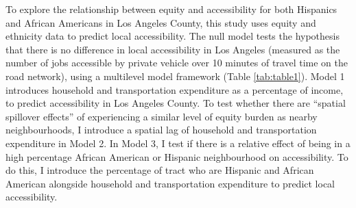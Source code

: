 \documentclass[a4paper,UKenglish]{lipics-v2018}
\begin{document}
To explore the relationship between equity and accessibility for both Hispanics and African Americans in Los Angeles County, this study uses equity and ethnicity data to predict local accessibility. The null model tests the hypothesis that there is no difference in local accessibility in Los Angeles (measured as the number of jobs accessible by private vehicle over 10 minutes of travel time on the road network), using a multilevel model framework (Table \ref{tab:table1}). Model 1 introduces household and transportation expenditure as a percentage of income, to predict accessibility in Los Angeles County. To test whether there are “spatial spillover effects” of experiencing a similar level of equity burden as nearby neighbourhoods, I introduce a spatial lag of household and transportation expenditure in Model 2. In Model 3, I test if there is a relative effect of being in a high percentage African American or Hispanic neighbourhood on accessibility. To do this, I introduce the percentage of tract who are Hispanic and African American alongside household and transportation expenditure to predict local accessibility.
\end{document}
